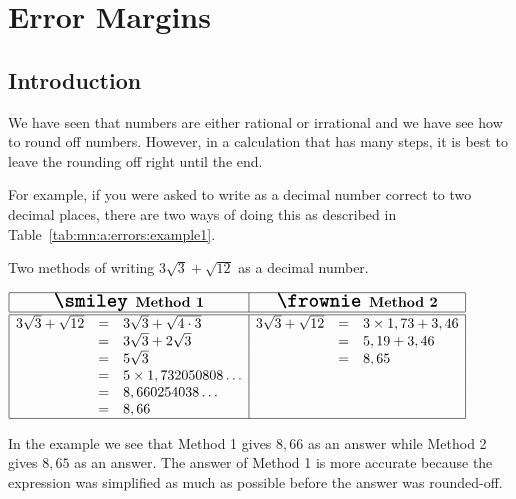 \chapter{Error Margins}
\label{m:ng11}

\section{Introduction}



We have seen that numbers are either rational or irrational and we have see how to round off numbers. However, in a calculation that has many steps, it is best to leave the rounding off right until the end.

For example, if you were asked to write
as a decimal number correct to two decimal places, there are two ways of doing this as described in Table~\ref{tab:mn:a:errors:example1}.

\begin{table}[htbp]
\begin{center}
\caption{Two methods of writing $3\sqrt{3}+\sqrt{12}$ as a decimal number.}
\label{tab:mn:a:errors:example1}
$\begin{array}{|rcl|rcl|}\hline
\multicolumn{3}{|c}{\textbf{\Large{\smiley} \normalsize Method 1}}& \multicolumn{3}{|c|}{\textbf{\Large{\frownie} \normalsize Method 2}}\\\hline\hline
3\sqrt{3}+\sqrt{12}&=&3\sqrt{3}+\sqrt{4\cdot 3} &3\sqrt{3}+\sqrt{12}&=&3 \times 1,73+3,46\\
&=&3\sqrt{3}+2\sqrt{3} &&=&5,19+3,46\\
&=&5\sqrt{3} &&=&8,65\\
&=&5 \times 1,732050808\ldots &&&\\
&=&8,660254038\ldots &&&\\
&=&8,66 &&&\\\hline
\end{array}$
\end{center}
\end{table}

In the example we see that Method 1 gives $8,66$ as an answer while Method 2 gives $8,65$ as an answer. The answer of Method 1 is more accurate because the expression was simplified as much as possible before the answer was rounded-off.

